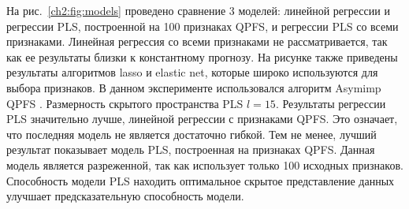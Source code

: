 На рис.~\ref{ch2:fig:models} проведено сравнение 3 моделей: линейной регрессии и регрессии PLS, построенной на 100 признаках QPFS, и регрессии PLS со всеми признаками.
Линейная регрессия со всеми признаками не рассматривается, так как ее результаты близки к константному прогнозу. На рисунке также приведены результаты алгоритмов lasso и elastic net, которые широко используются для выбора признаков.
В данном эксперименте использовался алгоритм Asymimp QPFS .
Размерность скрытого пространства PLS $l = 15$.
Результаты регрессии PLS значительно лучше, линейной регрессии с признаками QPFS.
Это означает, что последняя модель не является достаточно гибкой.
Тем не менее, лучший результат показывает модель PLS, построенная на признаках QPFS. 
Данная модель является разреженной, так как использует только 100 исходных признаков.
Способность модели PLS находить оптимальное скрытое представление данных улучшает предсказательную способность модели.

